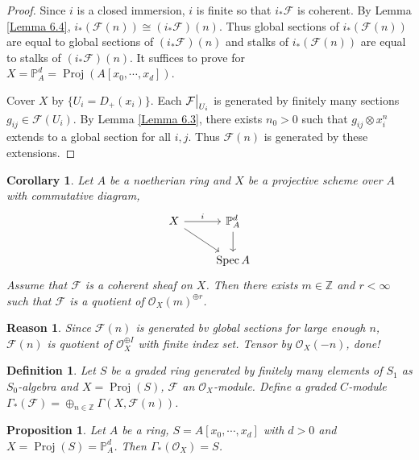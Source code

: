 \documentclass{ctexart}
\newtheorem{definition}{Definition}[section]
\newtheorem{proposition}{Proposition}[section]
\newtheorem{reason}{Reason}[section]
\newtheorem{corollary}{Corollary}[section]
\newcommand{\spec}{\operatorname{Spec}}
\newcommand{\proj}{\operatorname{Proj}}
\begin{document}
\begin{proof}
    Since $i$ is a closed immersion, $i$ is finite so that $i_{\ast}\mathcal{F}$ is coherent.
    By Lemma \ref{Lemma 6.4}, $i_{\ast}(\mathcal{F}(n)) \cong (i_{\ast}\mathcal{F})(n)$.
    Thus global sections of $i_{\ast}(\mathcal{F}(n))$ are equal to global sections of $(i_{\ast}\mathcal{F})(n)$ and stalks of $i_{\ast}(\mathcal{F}(n))$ are equal to stalks of $(i_{\ast}\mathcal{F})(n)$.
    It suffices to prove for $X = \mathbb{P}_{A}^{d} = \proj(A[x_{0}, \cdots, x_{d}])$.
    \par
    Cover $X$ by $\{U_{i} = D_{+}(x_{i})\}$.
    Each $\mathcal{F}\big{|}_{U_{i}}$ is generated by finitely many sections $g_{ij}\in \mathcal{F}(U_{i})$.
    By Lemma \ref{Lemma 6.3}, there exists $n_{0} > 0$ such that $g_{ij} \otimes x_{i}^{n}$ extends to a global section for all $i,j$.
    Thus $\mathcal{F}(n)$ is generated by these extensions.
\end{proof}
\begin{corollary}
    Let $A$ be a noetherian ring and $X$ be a projective scheme over $A$ with commutative diagram, 
    \begin{equation*}
        \begin{tikzcd}
            X \arrow[r, "i"] \arrow[dr] &
            \mathbb{P}_{A}^{d} \arrow[d] \\
            & \spec A
        \end{tikzcd}
    \end{equation*}
    Assume that $\mathcal{F}$ is a coherent sheaf on $X$.
    Then there exists $m\in \mathbb{Z}$ and $r < \infty$ such that $\mathcal{F}$ is a quotient of $\mathcal{O}_{X}(m)^{\oplus r}$.
    \label{Corollary 6.1}
\end{corollary}
\begin{reason}
    Since $\mathcal{F}(n)$ is generated bv global sections for large enough $n$,
    $\mathcal{F}(n)$ is quotient of $\mathcal{O}_{X}^{\oplus I}$ with finite index set.
    Tensor by $\mathcal{O}_{X}(-n)$, done!
\end{reason}
\begin{definition}
    Let $S$ be a graded ring generated by finitely many elements of $S_{1}$ as $S_{0}$-algebra and $X = \proj(S)$, $\mathcal{F}$ an $\mathcal{O}_{X}$-module.
    Define a graded $C$-module $\Gamma_{\ast}(\mathcal{F}) = \oplus_{n\in \mathbb{Z}} \Gamma(X, \mathcal{F}(n))$.
\end{definition}
\begin{proposition}
    Let $A$ be a ring, $S = A[x_{0}, \cdots, x_{d}]$ with $d > 0$ and $X = \proj(S) = \mathbb{P}_{A}^{d}$.
    Then $\Gamma_{\ast}(\mathcal{O}_{X}) = S$.
    \label{Proposition 6.9}
\end{proposition}
\end{document}
